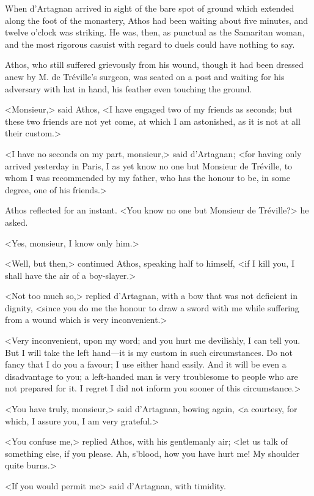 When d'Artagnan arrived in sight of the bare spot of ground which extended along the foot of the monastery, Athos had been waiting about five minutes, and twelve o'clock was striking. He was, then, as punctual as the Samaritan woman, and the most rigorous casuist with regard to duels could have nothing to say. 

Athos, who still suffered grievously from his wound, though it had been dressed anew by M. de Tréville's surgeon, was seated on a post and waiting for his adversary with hat in hand, his feather even touching the ground. 

<Monsieur,> said Athos, <I have engaged two of my friends as seconds; but these two friends are not yet come, at which I am astonished, as it is not at all their custom.> 

<I have no seconds on my part, monsieur,> said d'Artagnan; <for having only arrived yesterday in Paris, I as yet know no one but Monsieur de Tréville, to whom I was recommended by my father, who has the honour to be, in some degree, one of his friends.> 

Athos reflected for an instant. <You know no one but Monsieur de Tréville?> he asked. 

<Yes, monsieur, I know only him.> 

<Well, but then,> continued Athos, speaking half to himself, <if I kill you, I shall have the air of a boy-slayer.> 

<Not too much so,> replied d'Artagnan, with a bow that was not deficient in dignity, <since you do me the honour to draw a sword with me while suffering from a wound which is very inconvenient.> 

<Very inconvenient, upon my word; and you hurt me devilishly, I can tell you. But I will take the left hand---it is my custom in such circumstances. Do not fancy that I do you a favour; I use either hand easily. And it will be even a disadvantage to you; a left-handed man is very troublesome to people who are not prepared for it. I regret I did not inform you sooner of this circumstance.> 

<You have truly, monsieur,> said d'Artagnan, bowing again, <a courtesy, for which, I assure you, I am very grateful.> 

<You confuse me,> replied Athos, with his gentlemanly air; <let us talk of something else, if you please. Ah, s'blood, how you have hurt me! My shoulder quite burns.> 

<If you would permit me\longdash> said d'Artagnan, with timidity. 

